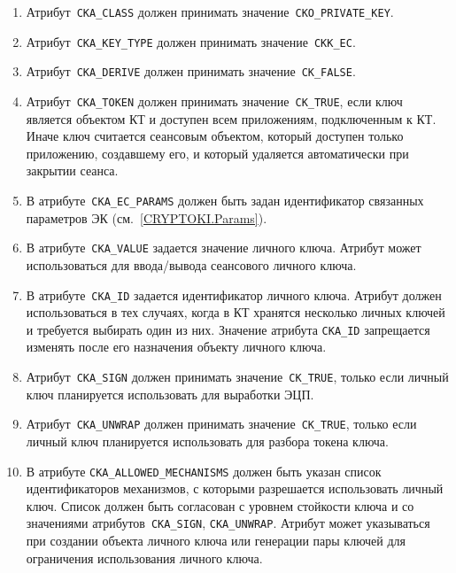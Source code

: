 \begin{enumerate}
\item
Атрибут~\verb|CKA_CLASS| должен принимать значение~\verb|CKO_PRIVATE_KEY|.

\item
Атрибут~\verb|CKA_KEY_TYPE| должен принимать значение~\verb|CKK_EC|.

\item
Атрибут~\verb|CKA_DERIVE| должен принимать значение~\verb|CK_FALSE|.

\item
Атрибут~\verb|CKA_TOKEN| должен принимать значение~\verb|CK_TRUE|,
если ключ является объектом КТ и доступен всем приложениям,
подключенным к КТ. 
%
Иначе ключ считается сеансовым объектом, который доступен только
приложению, создавшему его, и который удаляется автоматически при закрытии 
сеанса.

\item
В атрибуте~\verb|CKA_EC_PARAMS| должен быть задан идентификатор связанных
параметров ЭК (см.~\ref{CRYPTOKI.Params}).

\item
В атрибуте~\verb|CKA_VALUE| задается значение личного ключа.
Атрибут может использоваться для ввода/вывода сеансового личного ключа.

\item
В атрибуте~\verb|CKA_ID| задается идентификатор личного ключа.
Атрибут должен использоваться в тех случаях, когда в КТ
хранятся несколько личных ключей и требуется выбирать один из них. 
%
Значение атрибута \verb|CKA_ID| запрещается изменять
после его назначения объекту личного ключа.

\item
Атрибут~\verb|CKA_SIGN| должен принимать значение~\verb|CK_TRUE|,
только если личный ключ планируется использовать для выработки ЭЦП.

\item
Атрибут~\verb|CKA_UNWRAP| должен принимать значение~\verb|CK_TRUE|,
только если личный ключ планируется использовать для разбора
токена ключа.

\item
В атрибуте \verb|CKA_ALLOWED_MECHANISMS| должен быть указан список 
идентификаторов механизмов, с которыми разрешается использовать личный 
ключ. Список должен быть согласован с уровнем стойкости ключа и со 
значениями атрибутов~\verb|CKA_SIGN|, \verb|CKA_UNWRAP|. 
%
Атрибут может указываться при создании объекта личного ключа 
или генерации пары ключей для ограничения использования личного ключа. 


\end{enumerate}
